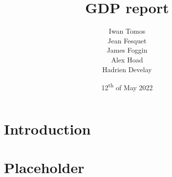 \documentclass{article}
\title{GDP report}
\author{
    Iwan Tomos\\
    Jean Fesquet\\
    James Foggin\\
    Alex Hoad\\
    Hadrien Develay
}
\date{12\textsuperscript{th} of May 2022}
\begin{document}
\maketitle

\section{Introduction}


\section{Placeholder}

\end{document}
